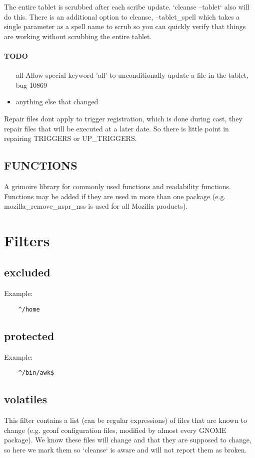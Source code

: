 \documentclass[a4paper,10pt]{book}
\begin{document}
The entire tablet is scrubbed after each scribe update. `cleanse --tablet` also
will do this. There is an additional option to cleanse, --tablet\_spell which
takes a single parameter as a spell name to scrub so you can quickly verify
that things are working without scrubbing the entire tablet.

\subsubsection{TODO}
\begin{itemize}
\item[all]
Allow special keyword 'all' to unconditionally update a file in the tablet, bug
10869
\item anything else that changed
\end{itemize}

Repair files dont apply to trigger registration, which is done during cast,
they repair files that will be executed at a later date. So there is little
point in repairing TRIGGERS or UP\_TRIGGERS.

\section{FUNCTIONS}
A grimoire library for commonly used functions and readability functions.
Functions may be added if they are used in more than one package (e.g.
mozilla\_remove\_nspr\_nss is used for all Mozilla products).

\chapter{Filters}
\section{excluded}

Example:
\begin{verbatim}
	^/home
\end{verbatim}

\section{protected}

Example:
\begin{verbatim}
	^/bin/awk$
\end{verbatim}

\section{volatiles}
This filter contains a list (can be regular expressions) of files that are
known to change (e.g. gconf configuration files, modified by almost every
GNOME package). We know these files will change and that they are supposed
to change, so here we mark them so `cleanse` is aware and will not report
them as broken.
\end{document}
